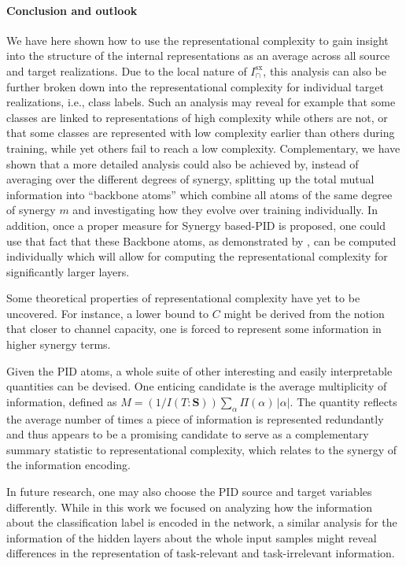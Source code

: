 \documentclass[10pt]{article}
\theoremstyle{definition}
\theoremstyle{plain}
\begin{document}
\paragraph{Conclusion and outlook}
We have here shown how to use the representational complexity to gain insight into the structure of the internal representations as an average across all source and target realizations. Due to the local nature of $I^{\mathrm{sx}}_\cap$, this analysis can also be further broken down into the representational complexity for individual target realizations, i.e., class labels. Such an analysis may reveal for example that some classes are linked to representations of high complexity while others are not, or that some classes are represented with low complexity earlier than others during training, while yet others fail to reach a low complexity. Complementary, 
we have shown that a more detailed analysis could also be achieved by, instead of averaging over the different degrees of synergy, splitting up the total mutual information into ``backbone atoms'' \citep{rosas_operational_2020} which combine all atoms of the same degree of synergy $m$ and investigating how they evolve over training individually. In addition, once a proper measure for Synergy based-PID is proposed, one could use that fact that these Backbone atoms, as demonstrated by \cite{rosas_operational_2020}, can be computed individually which will allow for computing the representational complexity for significantly larger layers.  

Some theoretical properties of representational complexity have yet to be uncovered. For instance, a lower bound to $C$ might be derived from the notion that closer to channel capacity, one is forced to represent some information in higher synergy terms.

Given the PID atoms, a whole suite of other interesting and easily interpretable quantities can be devised. One enticing candidate is the average multiplicity of information, defined as
    \mbox{$M = (1/I(T:\bm S)) \sum_\alpha \Pi(\alpha) \, |\alpha|$.}
The quantity reflects the average number of times a piece of information is represented redundantly and thus appears to be a promising candidate to serve as a complementary summary statistic to representational complexity, which relates to the synergy of the information encoding.

In future research, one may also choose the PID source and target variables differently. While in this work we focused on analyzing how the information about the classification label is encoded in the network, a similar analysis for the information of the hidden layers about the whole input samples might reveal differences in the representation of task-relevant and task-irrelevant information. 
\end{document}
